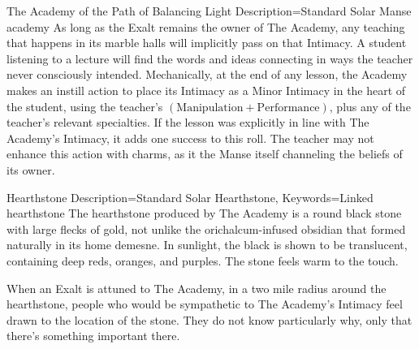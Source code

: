 \begin{Merit}{The Academy of the Path of Balancing Light}{
    Description=Standard Solar Manse
}{academy}
As long as the Exalt remains the owner of The Academy, any teaching that
happens in its marble halls will implicitly pass on that Intimacy. A student
listening to a lecture will find the words and ideas connecting in ways the
teacher never consciously intended. Mechanically, at the end of any lesson, the
Academy makes an instill action to place its Intimacy as a Minor Intimacy in
the heart of the student, using the teacher's $(\mathrm{Manipulation} +
\mathrm{Performance})$, plus any of the teacher's relevant specialties. If the
lesson was explicitly in line with The Academy's Intimacy, it adds one success
to this roll. The teacher may not enhance this action with charms, as it the
Manse itself channeling the beliefs of its owner.
\end{Merit}

\begin{Merit}{Hearthstone}{
    Description=Standard Solar Hearthstone,
    Keywords=Linked
}{hearthstone}
The hearthstone produced by The Academy is a round black stone with large
flecks of gold, not unlike the orichalcum-infused obsidian that formed
naturally in its home demesne. In sunlight, the black is shown to be
translucent, containing deep reds, oranges, and purples. The stone feels warm
to the touch.

When an Exalt is attuned to The Academy, in a two mile radius around the
hearthstone, people who would be sympathetic to The Academy's Intimacy feel
drawn to the location of the stone. They do not know particularly why, only
that there's something important there.
\end{Merit}


